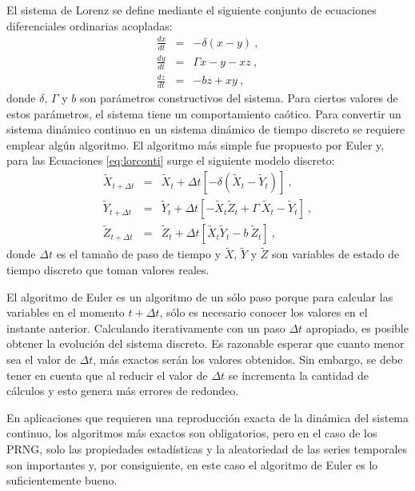 El sistema de Lorenz se define mediante el siguiente conjunto de ecuaciones diferenciales ordinarias acopladas:
%
\begin{eqnarray} \label{eq:lorconti}
\frac{dx}{dt}&=&-\delta(x-y) \ , \nonumber \\
\frac{dy}{dt}&=&\Gamma x-y-xz \ , \\
\frac{dz}{dt}&=&-bz+xy \ , \nonumber
\end{eqnarray}
%
donde $\delta$, $\Gamma$ y $b$ son parámetros constructivos del sistema.
Para ciertos valores de estos parámetros, el sistema tiene un comportamiento caótico.
Para convertir un sistema dinámico continuo en un sistema dinámico de tiempo discreto se requiere emplear algún algoritmo.
El algoritmo más simple fue propuesto por Euler y, para las Ecuaciones \ref{eq:lorconti} surge el siguiente modelo discreto:
%
\begin{eqnarray}\label{eq:loreuler}
{\widetilde X}_{t+\Delta t}&=&{\widetilde X}_{t}+ \Delta t \left[
- \delta \left( {\widetilde X}_{t}-{\widetilde Y}_{t} \right)
\right]
\ , \nonumber \\
{\widetilde Y}_{t+\Delta t}&=&{\widetilde Y}_{t}+ \Delta t \left[
-{\widetilde X}_{t}{\widetilde Z}_{t}+\Gamma~{\widetilde
X}_{t}-{\widetilde Y}_{t} \right] \ ,
\\
{\widetilde Z}_{t+\Delta t}&=&{\widetilde Z}_{t}+ \Delta t \left[
{\widetilde X}_{t}{\widetilde Y}_{t}-b~{\widetilde Z}_{t} \right]
\ , \nonumber
\end{eqnarray}
%
donde $\Delta t$ es el tamaño de paso de tiempo y $\widetilde X$, $\widetilde Y$ y $\widetilde Z$ son variables de estado de tiempo discreto que toman valores reales.

El algoritmo de Euler es un algoritmo de un sólo paso porque para calcular las variables en el momento $t + \Delta t$, sólo es necesario conocer los valores en el instante anterior.
Calculando iterativamente con un paso $\Delta t$ apropiado, es posible obtener la evolución del sistema discreto.
Es razonable esperar que cuanto menor sea el valor de $\Delta t$, más exactos serán los valores obtenidos.
Sin embargo, se debe tener en cuenta que al reducir el valor de $\Delta t$ se incrementa la cantidad de cálculos y esto genera más errores de redondeo.

En aplicaciones que requieren una reproducción exacta de la dinámica del sistema continuo, los algoritmos más exactos son obligatorios, pero en el caso de los PRNG, solo las propiedades estadísticas y la aleatoriedad de las series temporales son importantes y, por consiguiente, en este caso el algoritmo de Euler es lo suficientemente bueno.

